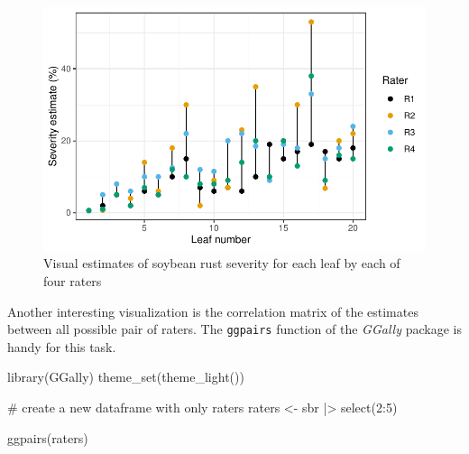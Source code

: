 \documentclass[
  letterpaper,
  DIV=11,
  numbers=noendperiod]{scrreprt}
\newenvironment{Shaded}{\begin{snugshade}}{\end{snugshade}}
\newcommand{\CommentTok}[1]{\textcolor[rgb]{0.37,0.37,0.37}{#1}}
\newcommand{\DecValTok}[1]{\textcolor[rgb]{0.68,0.00,0.00}{#1}}
\newcommand{\FunctionTok}[1]{\textcolor[rgb]{0.28,0.35,0.67}{#1}}
\newcommand{\NormalTok}[1]{\textcolor[rgb]{0.00,0.23,0.31}{#1}}
\newcommand{\OtherTok}[1]{\textcolor[rgb]{0.00,0.23,0.31}{#1}}
\newcommand{\SpecialCharTok}[1]{\textcolor[rgb]{0.37,0.37,0.37}{#1}}
\begin{document}
\begin{figure}[H]

{\centering \includegraphics{data-accuracy_files/figure-pdf/fig-raters1-1.pdf}

}

\caption{\label{fig-raters1}Visual estimates of soybean rust severity
for each leaf by each of four raters}

\end{figure}

Another interesting visualization is the correlation matrix of the
estimates between all possible pair of raters. The \texttt{ggpairs}
function of the \emph{GGally} package is handy for this task.

\begin{Shaded}
\begin{Highlighting}[]
\FunctionTok{library}\NormalTok{(GGally)}
\FunctionTok{theme\_set}\NormalTok{(}\FunctionTok{theme\_light}\NormalTok{())}

\CommentTok{\# create a new dataframe with only raters}
\NormalTok{raters }\OtherTok{\textless{}{-}}\NormalTok{ sbr }\SpecialCharTok{|\textgreater{}} 
  \FunctionTok{select}\NormalTok{(}\DecValTok{2}\SpecialCharTok{:}\DecValTok{5}\NormalTok{)}

\FunctionTok{ggpairs}\NormalTok{(raters)}
\end{Highlighting}
\end{Shaded}
\end{document}
